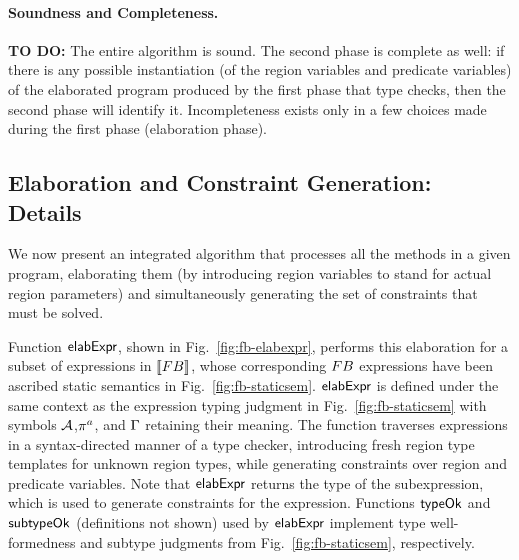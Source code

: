 
\paragraph{Soundness and Completeness.}

\textbf{TO DO:}
The entire algorithm is sound.
The second phase is complete as well: if there is any possible instantiation (of the
region variables and predicate variables) of the elaborated program produced by the first
phase that type checks, then the second phase will identify it.
Incompleteness exists only in a few choices made during the first phase (elaboration phase).

\subsection{Elaboration and Constraint Generation: Details}





We now present an integrated algorithm that processes all the methods
in a given program, elaborating them (by introducing region variables
to stand for actual region parameters) and simultaneously generating
the set of constraints that must be solved.

Function ${\sf elabExpr}$, shown in Fig.~\ref{fig:fb-elabexpr}, performs
this elaboration for a subset of expressions in $\llbracket {\sc FB} \rrbracket$, whose
corresponding ${\sc FB}$ expressions have been ascribed static semantics in
Fig.~\ref{fig:fb-staticsem}. ${\sf elabExpr}$ is defined under the same
context as the expression typing judgment in
Fig.~\ref{fig:fb-staticsem} with symbols ${\mathcal{A}}$,$\pi^a$, and $\Gamma$
retaining their meaning. The function traverses expressions in a
syntax-directed manner of a type checker, introducing fresh region
type templates for unknown region types, while generating constraints
over region and predicate variables.
Note that ${\sf elabExpr}$ returns the type of the subexpression,
which is used to generate constraints for the expression. Functions
${\sf typeOk}$ and ${\sf subtypeOk}$ (definitions not shown) used by ${\sf elabExpr}$
implement type well-formedness and subtype judgments from
Fig.~\ref{fig:fb-staticsem}, respectively.

